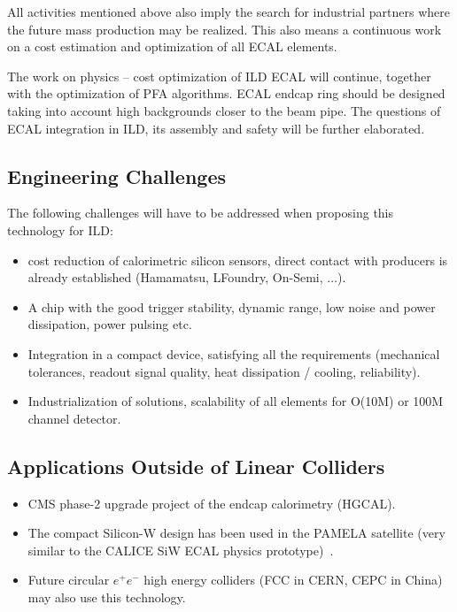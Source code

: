 All activities mentioned above also imply the search for industrial partners
where the future mass production may be realized. This also means a continuous
work on a cost estimation and optimization of all ECAL elements.

The work on physics -- cost optimization of ILD ECAL will continue, together
with the optimization of PFA algorithms. ECAL endcap ring should be designed
taking into account high backgrounds closer to the beam pipe. The questions of
ECAL integration in ILD, its assembly and safety will be further elaborated.

\subsection{Engineering Challenges}
The following challenges will have to be addressed when proposing this
technology for ILD:
\begin{itemize}
\item cost reduction of calorimetric silicon sensors, direct contact
 with producers is already established (Hamamatsu, LFoundry, On-Semi, $\ldots$).
\item A chip with the good trigger stability, dynamic range, low noise and
 power dissipation, power pulsing etc.
\item Integration in a compact device, satisfying all the requirements
 (mechanical tolerances, readout signal quality, heat dissipation / cooling,
 reliability).
\item Industrialization of solutions, scalability of all elements for O(10M)
 or 100M channel detector.
\end{itemize}

\subsection{Applications Outside of Linear Colliders}
\begin{itemize}
\item CMS phase-2 upgrade project of the
 endcap calorimetry (HGCAL).
\item The compact Silicon-W design has been used in the PAMELA satellite (very
 similar to the CALICE SiW ECAL physics prototype)~\cite{1742-6596-160-1-012039}.
\item Future circular $e^+e^-$ high energy colliders (FCC in CERN, CEPC in China)
may also use this technology.
\end{itemize}
